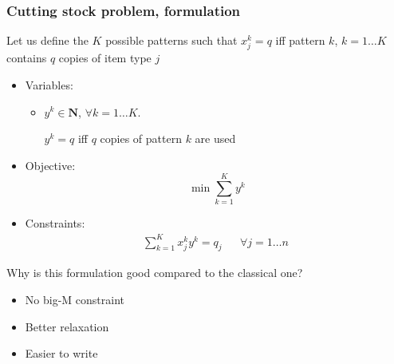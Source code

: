 \documentclass[10pt]{beamer}
\newcommand{\N}{\mathbf{N}}
\begin{document}
\begin{frame}
  \frametitle{Cutting stock problem, formulation}

  Let us define the $K$ possible patterns such that $x_j^k = q$ iff pattern $k$, $k = 1 \dots K$ contains $q$ copies of item type $j$

  \begin{itemize}
    \item Variables:
      \begin{itemize}
        \item $y^k \in \N$,
          $\forall k = 1 \dots K$.

          $y^k = q$ iff $q$ copies of pattern $k$ are used
      \end{itemize}

    \item Objective:
      \begin{displaymath}
        \min \sum_{k = 1}^{K} y^k
      \end{displaymath}

    \item Constraints:
      \begin{align*}
        \sum_{k = 1}^{K} x_j^k y^k = q_j && \forall j = 1 \dots n \
      \end{align*}
  \end{itemize}

  \pause Why is this formulation good compared to the classical one?
  \begin{itemize}
    \item \pause No big-M constraint
    \item Better relaxation
    \item Easier to write
  \end{itemize}
\end{frame}

\def\mystar#1#2#3#4#5#6#7{
  \begin{scope}[shift={(#2,#1)},opacity=#7,transparency group]
    \draw[line width=1pt,color=blue,arrows={Bracket-Bracket}] (0.4,0) -- +(#3,0);
    \draw[line width=5pt,color=red] (0.4,0) ++(#4,0) -- ++(#5,0);
    \def\tmp{#6}\if\tmp\empty\else
    \node[star, star point height=3mm, minimum size=5mm, color=yellow, fill=yellow, text=black,scale=.4] at (0,0) {#6};
    \fi
  \end{scope}
}

\def\mystaronly#1#2#3#4{
  \begin{scope}[shift={(#2,#1)},opacity=#4,transparency group]
    \node[star, star point height=3mm, minimum size=5mm, color=yellow, fill=yellow, text=black,scale=.4] at (0,0) {#3};
  \end{scope}
}
\end{document}

